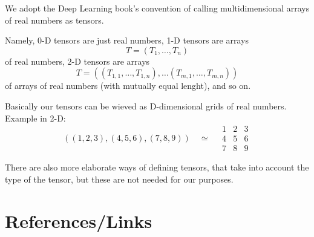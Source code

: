 \documentclass[]{article}
\begin{document}
We adopt the Deep Learning book's convention of calling multidimensional arrays
of real numbers as tensors.

Namely, 0-D tensors are just real numbers, 1-D tensors are arrays
\[
T = (T_1, \ldots, T_n)
\]
of real numbers, 2-D tensors are arrays
\[
T = ((T_{1,1}, \ldots, T_{1,n}), \ldots (T_{m,1}, \ldots, T_{m,n}))
\]
of arrays of real numbers (with mutually equal lenght), and so on.

Basically our tensors can be wieved as D-dimensional grids of real numbers.
Example in 2-D:
\[
((1, 2, 3), (4, 5, 6), (7, 8, 9)) \quad \simeq \quad
\begin{array}{c|c|c}
  1 & 2 & 3 \\
  \hline
  4 & 5 & 6 \\
  \hline
  7 & 8 & 9
 \end{array}
\]

There are also more elaborate ways of defining tensors, that take into account
the type of the tensor, but these are not needed for our purposes.

\section{References/Links}
\end{document}
